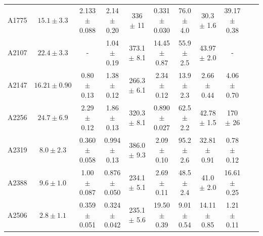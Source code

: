 \documentclass[11pt]{article}
\begin{document}
\begin{table}[htbp]
{\begin{tabular}{ccccccccccc}
A1775  & $15.1 \pm 3.3$ & 2.133 $\pm$ 0.088 & 2.14 $\pm$ 0.20 & 336 $\pm$ 11 & 0.331 $\pm$ 0.030 & 76.0 $\pm$ 4.0 & 30.3 $\pm$ 1.6 & 39.17 $\pm$ 0.38\\
A2107  & $22.4 \pm 3.3$ & - & 1.04 $\pm$ 0.19 & 373.1 $\pm$ 8.1 & 14.45 $\pm$ 0.87 & 55.9 $\pm$ 2.5 & 43.97 $\pm$ 2.0 & -\\
A2147  & $16.21 \pm 0.90$ & 0.80 $\pm$ 0.13 & 1.38 $\pm$ 0.12 & 266.3 $\pm$ 6.1 & 2.34 $\pm$ 0.12 & 13.9 $\pm$ 2.3 & 2.66 $\pm$ 0.44 & 4.06 $\pm$ 0.70 \\
A2256  & $24.7 \pm 6.9$ & 2.29 $\pm$ 0.12 & 1.86 $\pm$ 0.13 & 320.3 $\pm$ 8.1 & 0.890 $\pm$ 0.027 & 62.5 $\pm$ 2.2 & 42.78 $\pm$ 1.5 & 170 $\pm$ 26\\
A2319  & $8.0 \pm 2.3$ & 0.360 $\pm$ 0.058 & 0.994 $\pm$ 0.13 & 386.0 $\pm$ 9.3 & 2.09 $\pm$ 0.10 & 95.2 $\pm$ 2.6 & 32.81 $\pm$ 0.91 & 0.78 $\pm$ 0.12\\
A2388  & $9.6 \pm 1.0$ & 1.00 $\pm$ 0.087 & 0.876 $\pm$ 0.050 & 234.1 $\pm$ 5.1 & 2.69 $\pm$ 0.11 & 48.5 $\pm$ 2.4 & 41.0 $\pm$ 2.0 & 16.61 $\pm$ 0.25\\
A2506 & $2.8 \pm 1.1$  & 0.359 $\pm$ 0.051 & 0.324 $\pm$ 0.042 & 235.1 $\pm$ 5.6 & 19.50 $\pm$ 0.39 & 9.01 $\pm$ 0.54 & 14.11 $\pm$ 0.85 & 1.21 $\pm$ 0.11\\
\hline
\end{tabular}
}
\end{table}
\end{document}
